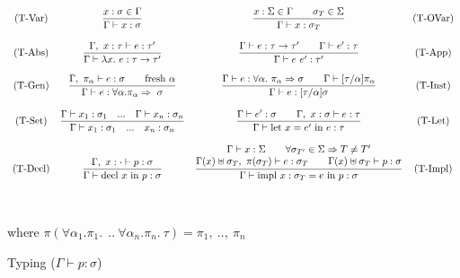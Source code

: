 \documentclass[runningheads]{llncs}
\begin{document}
\begin{figure}$$
  \begin{array}{c c c c} 
    \text{(T-Var)}
    &
    \displaystyle
    \frac{x: \sigma  \in \Gamma}
         {\Gamma \vdash x: \sigma }
    &
    \displaystyle
    \frac{x: \Sigma  \in \Gamma \quad \quad \sigma_T \in \Sigma}
    {\Gamma \vdash x: \sigma_T }
    &
    \text{(T-OVar)}
    \\\\
    \text{(T-Abs)}
    &
    \displaystyle
    \frac{\Gamma,\ x:\tau \vdash e : \tau^\prime}
         {\Gamma \vdash \lambda x. \ e : \tau \rightarrow \tau^\prime}
    &
    
    \displaystyle
    \frac{\Gamma \vdash e : \tau \rightarrow \tau^\prime \quad\quad \Gamma \vdash e^\prime : \tau}
         {\Gamma \vdash e \ e^\prime : \tau^\prime}
    &
    \text{(T-App)}
    \\\\
    \text{(T-Gen)}
    &
    \displaystyle
    \frac{\Gamma, \ \pi_\alpha\vdash e:\sigma \quad \quad \text{fresh }\alpha}
         {\Gamma \vdash e : \forall \alpha. \pi_\alpha \Rightarrow \ \sigma}
    &
    \displaystyle
    \frac{\Gamma \vdash e: \forall \alpha. \ \pi_\alpha \Rightarrow \sigma \quad \quad \Gamma \vdash [\tau/\alpha]\pi_\alpha}
         {\Gamma \vdash e:[\tau/\alpha]\sigma}
    &
    \text{(T-Inst)}
    \\\\
    \text{(T-Set)}
    &
    \displaystyle
    \frac{\Gamma \vdash x_1:\sigma_1  \quad ...\quad \Gamma \vdash x_n:\sigma_n}
         {\Gamma \vdash x_1:\sigma_1 \quad ...\quad x_n:\sigma_n}
    &
    \displaystyle
    \frac{\Gamma \vdash e^\prime : \sigma \quad \quad \Gamma,\ x:\sigma \vdash e : \tau}
         {\Gamma \vdash \text{let} \ x = e^\prime \ \text{in} \ e : \tau}
    &
    \text{(T-Let)}
    \\\\
    \text{(T-Decl)}
    &
    \displaystyle
    \frac{\Gamma, \ x: \cdot  \vdash p : \sigma}
         {\Gamma \vdash \text{decl} \ x \ \text{in} \ p : \sigma}
    &
    \displaystyle
    \frac{ \begin{matrix}
        \Gamma \vdash x : \Sigma \quad \quad  \forall \sigma_{T^\prime} \in \Sigma \Rightarrow T \neq T^\prime \\
        \Gamma(x) \uplus \sigma_T, \ \pi(\sigma_T) \vdash e : \sigma_T \quad \quad  \Gamma(x) \uplus \sigma_T \vdash p: \sigma
    \end{matrix}}
    {\Gamma \vdash \text{impl} \ x :  \sigma_T  = e \ \text{in} \ p : \sigma} 
    &
    \text{(T-Impl)}
  \end{array}$$
  \\\\
  where $\pi(\forall \alpha_1. \pi_1 .\ \ .. \ \forall \alpha_n. \pi_n. \ \tau) = \pi_1, \ .. , \ \pi_n$
  \caption{Typing ($\Gamma \vdash p : \sigma$)}
\end{figure}
\end{document}
